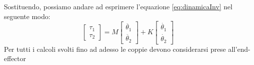 Sostituendo, possiamo andare ad esprimere l'equazione \ref{eq:dinamicaInv} nel seguente modo:
\begin{equation}
    \begin{bmatrix}
    \tau_1 \\ \tau_2
    \end{bmatrix} = 
    M\begin{bmatrix}
    \ddot{\theta_1} \\ \ddot{\theta_2}
    \end{bmatrix}
    + K \begin{bmatrix}
    \dot{\theta_1} \\ \dot{\theta_2}
    \end{bmatrix}
\end{equation}
Per tutti i calcoli svolti fino ad adesso le coppie devono considerarsi prese all'end-effector

